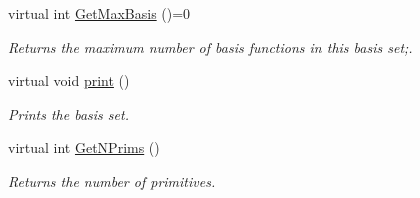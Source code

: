 \begin{DoxyCompactItemize}
virtual int \hyperlink{classJKBuilder_1_1BasisSet_a7c12871050e478f6a22c4c1c46bd4b21}{GetMaxBasis} ()=0
\begin{DoxyCompactList}\small\item\em Returns the maximum number of basis functions in this basis set;. \item\end{DoxyCompactList}\item 
virtual void \hyperlink{classJKBuilder_1_1BasisSet_a388f572c62279f839ee138a9afbdeeb5}{print} ()
\begin{DoxyCompactList}\small\item\em Prints the basis set. \item\end{DoxyCompactList}\item 
virtual int \hyperlink{classJKBuilder_1_1BasisSet_abc886cd4e35d3c56a0250b7d06986f61}{GetNPrims} ()
\begin{DoxyCompactList}\small\item\em Returns the number of primitives. \item\end{DoxyCompactList}\end{DoxyCompactItemize}
